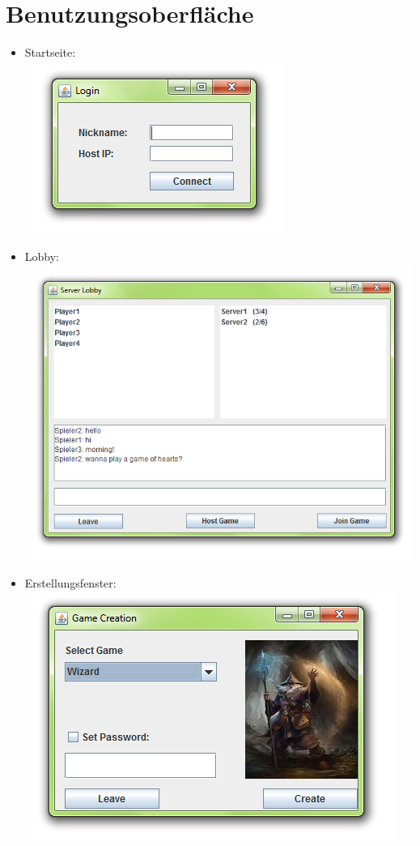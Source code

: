 \documentclass{article}
\begin{document}
\section{Benutzungsoberfläche}
\begin{itemize}
	\item Startseite: \\ \includegraphics{GUI_images/Login}
	\item Lobby: \\ \includegraphics[scale=0.7]{GUI_images/ServerLobby}
	\item Erstellungsfenster: \\ 
		\includegraphics[scale=0.8]{GUI_images/CreateGame}

\end{itemize}
\end{document}
